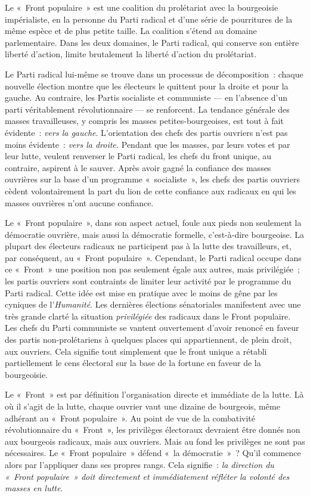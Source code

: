 \documentclass[french,twoside]{book} %
\begin{document}
\noindent Le « Front populaire » est une coalition du prolétariat avec la bourgeoisie impérialiste, en la personne du Parti radical et d’une série de pourritures de la même espèce et de plus petite taille. La coalition s’étend au domaine parlementaire. Dans les deux domaines, le Parti radical, qui conserve son entière liberté d’action, limite brutalement la liberté d’action du prolétariat.\par
Le Parti radical lui-même se trouve dans un processus de décomposition : chaque nouvelle élection montre que les électeurs le quittent pour la droite et pour la gauche. Au contraire, les Partis socialiste et communiste — en l’absence d’un parti véritablement révolutionnaire — se renforcent. La tendance générale des masses travailleuses, y compris les masses petites-bourgeoises, est tout à fait évidente : \emph{vers la gauche}. L’orientation des chefs des partis ouvriers n’est pas moins évidente : \emph{vers la droite. }Pendant que les masses, par leurs votes et par leur lutte, veulent renverser le Parti radical, les chefs du front unique, au contraire, aspirent à le sauver. Après avoir gagné la confiance des masses ouvrières sur la base d’un programme « socialiste », les chefs des partis ouvriers cèdent volontairement la part du lion de cette confiance aux radicaux en qui les masses ouvrières n’ont aucune confiance.\par
Le « Front populaire », dans son aspect actuel, foule  aux pieds non seulement la démocratie ouvrière, mais aussi la démocratie formelle, c’est-à-dire bourgeoise. La plupart des électeurs radicaux ne participent pas à la lutte des travailleurs, et, par conséquent, au « Front populaire ». Cependant, le Parti radical occupe dans ce « Front » une position non pas seulement égale aux autres, mais privilégiée ; les partis ouvriers sont contraints de limiter leur activité par le programme du Parti radical. Cette idée est mise en pratique avec le moins de gêne par les cyniques de l’\emph{Humanité}. Les dernières élections sénatoriales manifestent avec une très grande clarté la situation \emph{privilégiée} des radicaux dans le Front populaire. Les chefs du Parti communiste se vantent ouvertement d’avoir renoncé en faveur des partis non-prolétariens à quelques places qui appartiennent, de plein droit, aux ouvriers. Cela signifie tout simplement que le front unique a rétabli partiellement le cens électoral sur la base de la fortune en faveur de la bourgeoisie.\par
Le « Front » est par définition l’organisation directe et immédiate de la lutte. Là où il s’agit de la lutte, chaque ouvrier vaut une dizaine de bourgeois, même adhérant au « Front populaire ». Au point de vue de la combativité révolutionnaire du « Front », les privilèges électoraux devraient être donnés non aux bourgeois radicaux, mais aux ouvriers. Mais au fond les privilèges ne sont pas nécessaires. Le « Front populaire » défend « la démocratie » ? Qu’il commence alors par l’appliquer dans ses propres rangs. Cela signifie : \emph{la direction du « Front populaire » doit directement et immédiatement réfléter la volonté des masses en lutte}.\par
\end{document}
